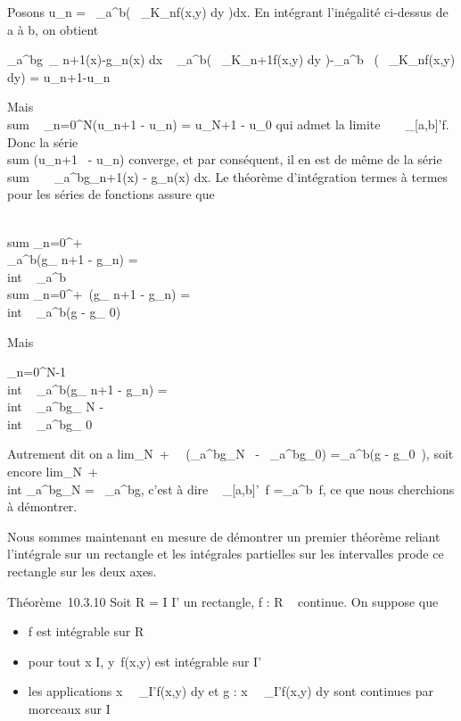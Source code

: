 \documentclass[]{article}
\begin{document}
Posons u\_n =\int ~
\_a^b\left (\int ~
\_K\_n\textbar{}f(x,y)\textbar{} dy\right
)dx. En intégrant l'inégalité ci-dessus de a à b, on obtient

\int  \_a^b\textbar{}g~\_
n+1(x)-g\_n(x)\textbar{} dx \leq\int ~
\_a^b\left (\int ~
\_K\_n+1\textbar{}f(x,y)\textbar{} dy\right
)-\int  \_a^b~\left
(\int ~
\_K\_n\textbar{}f(x,y)\textbar{} dy\right )
= u\_n+1-u\_n

Mais \\sum ~
\_n=0^N(u\_n+1 - u\_n) = u\_N+1 -
u\_0 qui admet la limite \int ~
\int ~
\_{[}a,b{]}\timesI'\textbar{}f\textbar{}. Donc la série
\\sum  (u\_n+1~ -
u\_n) converge, et par conséquent, il en est de même de la série
\\sum ~
\int ~
\_a^b\textbar{}g\_n+1(x) -
g\_n(x)\textbar{} dx. Le théorème d'intégration termes à termes
pour les séries de fonctions assure que

\\sum
\_n=0^+\infty~\\\int
  \_a^b(g\_ n+1 - g\_n) =
\\int  ~
\_a^b \\sum
\_n=0^+\infty~(g\_ n+1 - g\_n) =
\\int  ~
\_a^b(g - g\_ 0)

Mais

\sum \_n=0^N-1~
\\int  ~
\_a^b(g\_ n+1 - g\_n) =
\\int  ~
\_a^bg\_ N
-\\int  ~
\_a^bg\_ 0

Autrement dit on a
lim\_N\rightarrow~+\infty~~\left
(\int  \_a^bg\_N~
-\int ~
\_a^bg\_0\right )
=\int  \_a^b(g - g\_0~),
soit encore
lim\_N\rightarrow~+\infty~~\\int
 \_a^bg\_N =\int ~
\_a^bg, c'est à dire \int ~
\int  \_{[}a,b{]}\timesI'~f
=\int  \_a^b~f, ce que nous
cherchions à démontrer.

Nous sommes maintenant en mesure de démontrer un premier théorème
reliant l'intégrale sur un rectangle et les intégrales partielles sur
les intervalles pro\jmathections de ce rectangle sur les deux axes.

Théorème~10.3.10 Soit R = I \times I' un rectangle, f : R \rightarrow~  continue. On
suppose que

\begin{itemize}
\itemsep1pt\parskip0pt
\item
  f est intégrable sur R
\item
  pour tout x \in I, y\mapsto~f(x,y) est intégrable
  sur I'
\item
  les applications
  x\mapsto~\int ~
  \_I'\textbar{}f(x,y)\textbar{} dy et g :
  x\mapsto~\int ~
  \_I'f(x,y) dy sont continues par morceaux sur I
\end{itemize}
\end{document}
